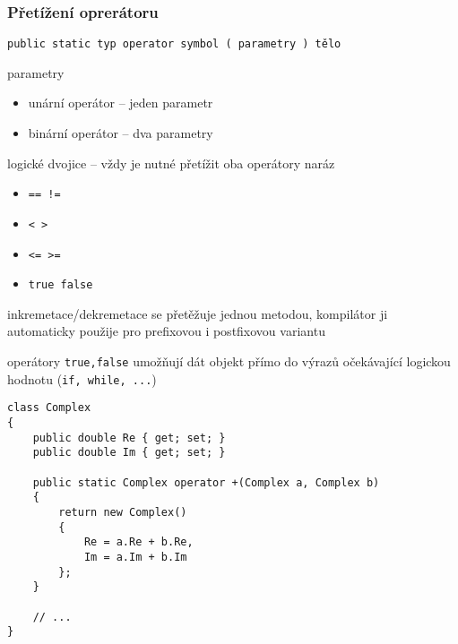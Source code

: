 \begin{frame}[fragile]
\frametitle{Přetížení oprerátoru}
\vfill
\begin{noteblock}{}
\begin{lstlisting}
public static typ operator symbol ( parametry ) tělo
\end{lstlisting}
\end{noteblock}
\vfill
\begin{bitemize}{}
\item parametry
\begin{itemize}
\item unární operátor -- jeden parametr
\item binární operátor -- dva parametry
\end{itemize}

\item logické dvojice -- vždy je nutné přetížit oba operátory naráz
\begin{itemize}
\item \lstinline|== !=|
\item \lstinline|< >|
\item \lstinline|<= >=|
\item \lstinline|true false|
\end{itemize}

\item inkremetace/dekremetace se přetěžuje jednou metodou, kompilátor ji automaticky použije pro prefixovou i postfixovou variantu
\item operátory \lstinline|true,false| umožňují dát objekt přímo do výrazů očekávající logickou hodnotu (\lstinline|if, while, ...|)

\end{bitemize}
\vfill
\end{frame}




\begin{frame}[fragile]
\begin{yesblock}
\begin{lstlisting}
class Complex
{
    public double Re { get; set; }
    public double Im { get; set; }

    public static Complex operator +(Complex a, Complex b)
    {
        return new Complex()
        {
            Re = a.Re + b.Re,
            Im = a.Im + b.Im
        };
    }

    // ...
}
\end{lstlisting}
\end{yesblock}
\end{frame}




